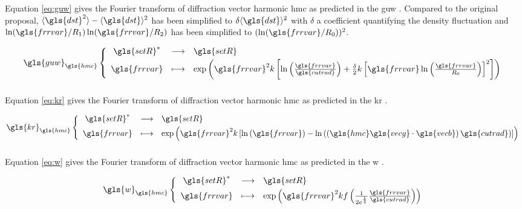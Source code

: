 \subsubsection{}

Equation \eqref{eq:guw} gives the Fourier transform of diffraction vector harmonic \gls{hmc} as predicted in the \gls{guw} \cite{GUW1988}.
Compared to the original proposal, \( \langle \gls{dst}^2 \rangle - \langle \gls{dst} \rangle^2 \) has been simplified to \( \delta \langle \gls{dst} \rangle^2 \) with \( \delta \) a coefficient quantifying the density fluctuation and \( \ln(\gls{frrvar}/R_1) \ln(\gls{frrvar}/R_2) \) has been simplified to \( (\ln(\gls{frrvar}/R_0))^2 \).

\begin{equation}
  \define{
    \gls{guw}_{\gls{hmc}}
  }{
    \gls{setR}^*
  }{
    \gls{setR}
  }{
    \gls{frrvar}
  }{
    \exp\left( \gls{frrvar}^2 k \left[ \ln \left( \frac{\gls{frrvar}}{\gls{cutrad}} \right) + \frac{\delta}{2} k \left[ \gls{frrvar} \ln\left( \frac{\gls{frrvar}}{R_0} \right) \right]^2 \right] \right)
  }
  \label{eq:guw}
\end{equation}

\subsubsection{}

Equation \eqref{eq:kr} gives the Fourier transform of diffraction vector harmonic \gls{hmc} as predicted in the \gls{kr} \cite{KR1963}.

\begin{equation}
  \define{
    \gls{kr}_{\gls{hmc}}
  }{
    \gls{setR}^*
  }{
    \gls{setR}
  }{
    \gls{frrvar}
  }{
    \exp\left( \gls{frrvar}^2 k \left[ \ln \left( \gls{frrvar} \right) - \ln\left( \left( \gls{hmc} \gls{vecg} \cdot \gls{vecb} \right) \gls{cutrad} \right) \right] \right)
  }
  \label{eq:kr}
\end{equation}

\subsubsection{}

Equation \eqref{eq:w} gives the Fourier transform of diffraction vector harmonic \gls{hmc} as predicted in the \gls{w} \cite{W1970}.

\begin{equation}
  \define{
    \gls{w}_{\gls{hmc}}
  }{
    \gls{setR}^*
  }{
    \gls{setR}
  }{
    \gls{frrvar}
  }{
    \exp\left( \gls{frrvar}^2 k f \left( \frac{1}{2e^\frac{1}{4}} \frac{\gls{frrvar}}{\gls{cutrad}} \right) \right)
  }
  \label{eq:w}
\end{equation}

